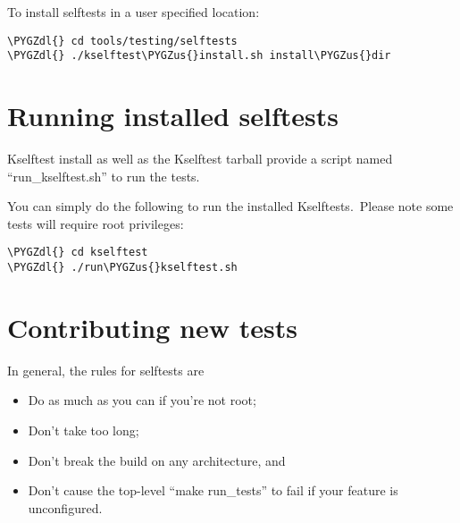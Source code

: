 \documentclass[a4paper,8pt,english]{sphinxmanual}
\def\PYGZus{\char`\_}
\def\PYGZdl{\char`\$}
\begin{document}
To install selftests in a user specified location:

\begin{Verbatim}[commandchars=\\\{\}]
\PYGZdl{} cd tools/testing/selftests
\PYGZdl{} ./kselftest\PYGZus{}install.sh install\PYGZus{}dir
\end{Verbatim}


\section{Running installed selftests}
\label{dev-tools/kselftest:running-installed-selftests}
Kselftest install as well as the Kselftest tarball provide a script
named ``run\_kselftest.sh'' to run the tests.

You can simply do the following to run the installed Kselftests. Please
note some tests will require root privileges:

\begin{Verbatim}[commandchars=\\\{\}]
\PYGZdl{} cd kselftest
\PYGZdl{} ./run\PYGZus{}kselftest.sh
\end{Verbatim}


\section{Contributing new tests}
\label{dev-tools/kselftest:contributing-new-tests}
In general, the rules for selftests are
\begin{itemize}
\item {} 
Do as much as you can if you're not root;

\item {} 
Don't take too long;

\item {} 
Don't break the build on any architecture, and

\item {} 
Don't cause the top-level ``make run\_tests'' to fail if your feature is
unconfigured.

\end{itemize}
\end{document}
